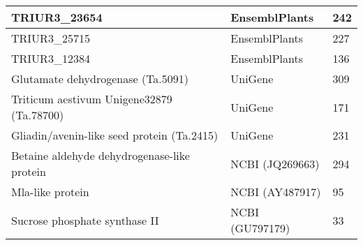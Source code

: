 {\begin{longtable}{|p{5cm}|p{5cm}|p{5cm}|}
\hline
TRIUR3\_23654 & EnsemblPlants  & 242 \\
\hline
TRIUR3\_25715 & EnsemblPlants  & 227 \\
\hline
TRIUR3\_12384 & EnsemblPlants  & 136 \\
\hline
Glutamate dehydrogenase (Ta.5091) & UniGene & 309 \\
\hline
Triticum aestivum Unigene32879 (Ta.78700) & UniGene & 171 \\
\hline
Gliadin/avenin-like seed protein (Ta.2415) & UniGene & 231 \\
\hline
Betaine aldehyde dehydrogenase-like protein & NCBI (JQ269663) & 294 \\
\hline
Mla-like protein & NCBI (AY487917) & 95 \\
\hline
Sucrose phosphate synthase II & NCBI (GU797179) & 33 \\
\hline
\end{longtable}
}
\endgroup